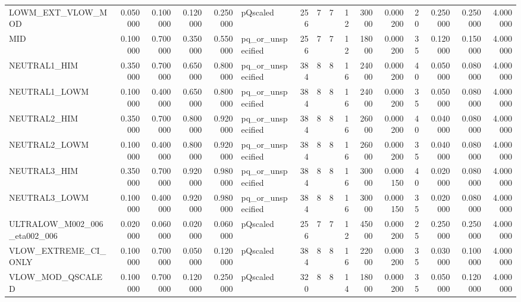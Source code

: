 \begin{longtable}{lrrrrlrrrrrrrrrr}
LOWM_EXT_VLOW_MOD & 0.050000 & 0.100000 & 0.120000 & 0.250000 & pQscaled & 256 & 7 & 7 & 12 & 30000 & 0.000200 & 20 & 0.250000 & 0.250000 & 4.000000 \\
MID & 0.100000 & 0.700000 & 0.350000 & 0.550000 & pq_or_unspecified & 256 & 7 & 7 & 12 & 18000 & 0.000200 & 35 & 0.120000 & 0.150000 & 4.000000 \\
NEUTRAL1_HIM & 0.350000 & 0.700000 & 0.650000 & 0.800000 & pq_or_unspecified & 384 & 8 & 8 & 16 & 24000 & 0.000200 & 40 & 0.050000 & 0.080000 & 4.000000 \\
NEUTRAL1_LOWM & 0.100000 & 0.400000 & 0.650000 & 0.800000 & pq_or_unspecified & 384 & 8 & 8 & 16 & 24000 & 0.000200 & 35 & 0.050000 & 0.080000 & 4.000000 \\
NEUTRAL2_HIM & 0.350000 & 0.700000 & 0.800000 & 0.920000 & pq_or_unspecified & 384 & 8 & 8 & 16 & 26000 & 0.000200 & 40 & 0.040000 & 0.080000 & 4.000000 \\
NEUTRAL2_LOWM & 0.100000 & 0.400000 & 0.800000 & 0.920000 & pq_or_unspecified & 384 & 8 & 8 & 16 & 26000 & 0.000200 & 35 & 0.040000 & 0.080000 & 4.000000 \\
NEUTRAL3_HIM & 0.350000 & 0.700000 & 0.920000 & 0.980000 & pq_or_unspecified & 384 & 8 & 8 & 16 & 30000 & 0.000150 & 40 & 0.020000 & 0.080000 & 4.000000 \\
NEUTRAL3_LOWM & 0.100000 & 0.400000 & 0.920000 & 0.980000 & pq_or_unspecified & 384 & 8 & 8 & 16 & 30000 & 0.000150 & 35 & 0.020000 & 0.080000 & 4.000000 \\
ULTRALOW_M002_006_eta002_006 & 0.020000 & 0.060000 & 0.020000 & 0.060000 & pQscaled & 256 & 7 & 7 & 12 & 45000 & 0.000200 & 25 & 0.250000 & 0.250000 & 4.000000 \\
VLOW_EXTREME_CI_ONLY & 0.100000 & 0.700000 & 0.050000 & 0.120000 & pQscaled & 384 & 8 & 8 & 16 & 22000 & 0.000200 & 35 & 0.030000 & 0.100000 & 4.000000 \\
VLOW_MOD_QSCALED & 0.100000 & 0.700000 & 0.120000 & 0.250000 & pQscaled & 320 & 8 & 8 & 14 & 18000 & 0.000200 & 35 & 0.050000 & 0.120000 & 4.000000 \\
\end{longtable}
